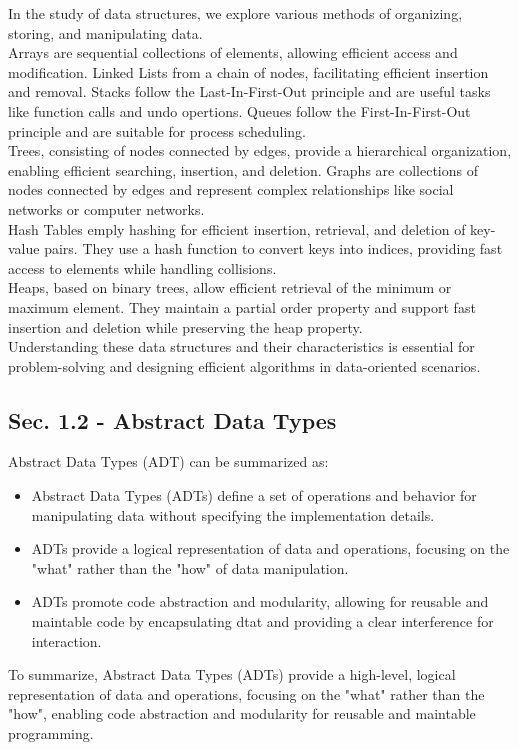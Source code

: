 In the study of data structures, we explore various methods of organizing, storing, and manipulating data. \\

\noindent Arrays are sequential collections of elements, allowing efficient access and modification. Linked Lists from a chain of nodes, facilitating
efficient insertion and removal. Stacks follow the Last-In-First-Out principle and are useful tasks like function calls and undo opertions.
Queues follow the First-In-First-Out principle and are suitable for process scheduling. \\

\noindent Trees, consisting of nodes connected by edges, provide a hierarchical organization, enabling efficient searching, insertion, and deletion.
Graphs are collections of nodes connected by edges and represent complex relationships like social networks or computer networks. \\

\noindent Hash Tables emply hashing for efficient insertion, retrieval, and deletion of key-value pairs. They use a hash function to convert keys into
indices, providing fast access to elements while handling collisions. \\

\noindent Heaps, based on binary trees, allow efficient retrieval of the minimum or maximum element. They maintain a partial order property and support
fast insertion and deletion while preserving the heap property. \\

\noindent Understanding these data structures and their characteristics is essential for problem-solving and designing efficient algorithms in data-oriented
scenarios. \\

\subsection*{Sec. 1.2 - Abstract Data Types}
\noindent Abstract Data Types (ADT) can be summarized as:
\begin{itemize}
    \item Abstract Data Types (ADTs) define a set of operations and behavior for manipulating data without specifying the implementation details.
    \item ADTs provide a logical representation of data and operations, focusing on the "what" rather than the "how" of data manipulation.
    \item ADTs promote code abstraction and modularity, allowing for reusable and maintable code by encapsulating dtat and providing a clear interference for interaction.
\end{itemize}
To summarize, Abstract Data Types (ADTs) provide a high-level, logical representation of data and operations, focusing on the "what" rather than the "how", enabling
code abstraction and modularity for reusable and maintable programming.

